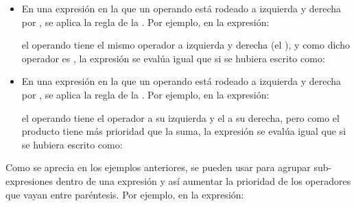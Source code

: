 \documentclass[a4paper,12pt,spanish]{sphinxmanual}
\begin{document}
\begin{itemize}
\item {} 
En una expresión en la que un operando está rodeado a izquierda y derecha por
, se aplica la regla de la . Por ejemplo,
en la expresión:

\begin{sphinxVerbatim}[commandchars=\\\{\}]
    
\end{sphinxVerbatim}

el operando  tiene el mismo operador a izquierda y derecha (el \sphinxcode{+}), y
como dicho operador es , la expresión se evalúa
igual que si se hubiera escrito como:

\begin{sphinxVerbatim}[commandchars=\\\{\}]
    
\end{sphinxVerbatim}

\item {} 
En una expresión en la que un operando está rodeado a izquierda y derecha por
, se aplica la regla de la . Por ejemplo,
en la expresión:

\begin{sphinxVerbatim}[commandchars=\\\{\}]
    
\end{sphinxVerbatim}

el operando  tiene el operador \sphinxcode{+} a su izquierda y el \sphinxcode{*} a su
derecha, pero como el producto tiene más prioridad que la suma, la expresión
se evalúa igual que si se hubiera escrito como:

\begin{sphinxVerbatim}[commandchars=\\\{\}]
    
\end{sphinxVerbatim}

\end{itemize}

Como se aprecia en los ejemplos anteriores, se pueden usar  para
agrupar sub-expresiones dentro de una expresión y así aumentar la prioridad de
los operadores que vayan entre paréntesis. Por ejemplo, en la expresión:
\end{document}
